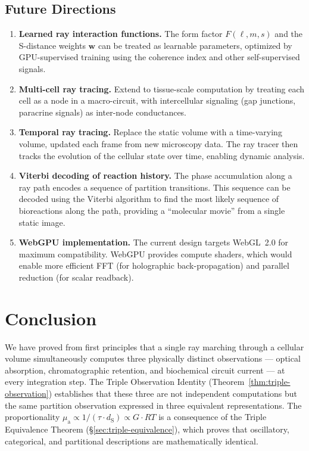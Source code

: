 \documentclass[11pt,twocolumn,a4paper]{article}
\newcommand{\dS}{d_{\mathrm{S}}}
\newcommand{\muabs}{\mu_{\mathrm{a}}}
\begin{document}
\subsection{Future Directions}

\begin{enumerate}[leftmargin=*,itemsep=2pt]
\item \textbf{Learned ray interaction functions.} The form factor
  $F(\ell,m,s)$ and the S-distance weights $\mathbf{w}$ can be
  treated as learnable parameters, optimized by GPU-supervised
  training using the coherence index and other self-supervised
  signals.

\item \textbf{Multi-cell ray tracing.} Extend to tissue-scale
  computation by treating each cell as a node in a macro-circuit,
  with intercellular signaling (gap junctions, paracrine signals)
  as inter-node conductances.

\item \textbf{Temporal ray tracing.} Replace the static volume with a
  time-varying volume, updated each frame from new microscopy data.
  The ray tracer then tracks the evolution of the cellular state over
  time, enabling dynamic analysis.

\item \textbf{Viterbi decoding of reaction history.} The phase
  accumulation along a ray path encodes a sequence of partition
  transitions. This sequence can be decoded using the Viterbi
  algorithm \citep{viterbi1967} to find the most likely sequence of
  bioreactions along the path, providing a ``molecular movie'' from a
  single static image.

\item \textbf{WebGPU implementation.} The current design targets
  WebGL~2.0 for maximum compatibility. WebGPU \citep{webgpu2024}
  provides compute shaders, which would enable more efficient FFT
  (for holographic back-propagation) and parallel reduction (for
  scalar readback).
\end{enumerate}


\section{Conclusion}
\label{sec:conclusion}

We have proved from first principles that a single ray marching through
a cellular volume simultaneously computes three physically distinct
observations --- optical absorption, chromatographic retention, and
biochemical circuit current --- at every integration step. The Triple
Observation Identity (Theorem~\ref{thm:triple-observation}) establishes
that these three are not independent computations but the same
partition observation expressed in three equivalent representations.
The proportionality $\muabs \propto 1/(\tau \cdot \dS) \propto G \cdot
RT$ is a consequence of the Triple Equivalence Theorem
(\S\ref{sec:triple-equivalence}), which proves that oscillatory,
categorical, and partitional descriptions are mathematically identical.
\end{document}
